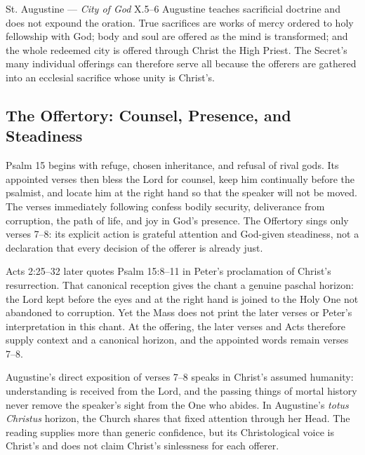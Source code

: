 \begin{sourcecard}{St. Augustine --- \emph{City of God} X.5--6}
Augustine teaches sacrificial doctrine and does not expound the oration. True sacrifices are works of mercy ordered to holy fellowship with God; body and soul are offered as the mind is transformed; and the whole redeemed city is offered through Christ the High Priest. The Secret's many individual offerings can therefore serve all because the offerers are gathered into an ecclesial sacrifice whose unity is Christ's.
\end{sourcecard}

\sectionguard
\subsection*{The Offertory: Counsel, Presence, and Steadiness\enspace{}}

Psalm 15 begins with refuge, chosen inheritance, and refusal of rival gods. Its appointed verses then bless the Lord for counsel, keep him continually before the psalmist, and locate him at the right hand so that the speaker will not be moved. The verses immediately following confess bodily security, deliverance from corruption, the path of life, and joy in God's presence. The Offertory sings only verses 7--8: its explicit action is grateful attention and God-given steadiness, not a declaration that every decision of the offerer is already just.

Acts 2:25--32 later quotes Psalm 15:8--11 in Peter's proclamation of Christ's resurrection. That canonical reception gives the chant a genuine paschal horizon: the Lord kept before the eyes and at the right hand is joined to the Holy One not abandoned to corruption. Yet the Mass does not print the later verses or Peter's interpretation in this chant. At the offering, the later verses and Acts therefore supply context and a canonical horizon, and the appointed words remain verses 7--8.

Augustine's direct exposition of verses 7--8 speaks in Christ's assumed humanity: understanding is received from the Lord, and the passing things of mortal history never remove the speaker's sight from the One who abides. In Augustine's \emph{totus Christus} horizon, the Church shares that fixed attention through her Head. The reading supplies more than generic confidence, but its Christological voice is Christ's and does not claim Christ's sinlessness for each offerer.

